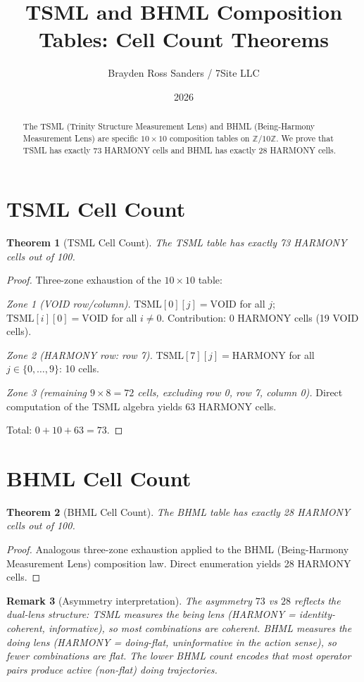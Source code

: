 \documentclass{amsart}
\title{TSML and BHML Composition Tables: Cell Count Theorems}
\author{Brayden Ross Sanders / 7Site LLC}
\date{2026}
\newtheorem{theorem}{Theorem}
\newtheorem{remark}[theorem]{Remark}
\begin{document}
\maketitle

\begin{abstract}
The TSML (Trinity Structure Measurement Lens) and BHML (Being-Harmony Measurement Lens)
are specific $10 \times 10$ composition tables on $\mathbb{Z}/10\mathbb{Z}$.
We prove that TSML has exactly 73 HARMONY cells and BHML has exactly 28 HARMONY cells.
\end{abstract}

\section{TSML Cell Count}

\begin{theorem}[TSML Cell Count]
The TSML table has exactly 73 HARMONY cells out of 100.
\end{theorem}

\begin{proof}
Three-zone exhaustion of the $10 \times 10$ table:

\emph{Zone 1 (VOID row/column).}
$\mathrm{TSML}[0][j] = \mathrm{VOID}$ for all $j$;
$\mathrm{TSML}[i][0] = \mathrm{VOID}$ for all $i \neq 0$.
Contribution: 0 HARMONY cells (19 VOID cells).

\emph{Zone 2 (HARMONY row: row 7).}
$\mathrm{TSML}[7][j] = \mathrm{HARMONY}$ for all $j \in \{0,\ldots,9\}$: 10 cells.

\emph{Zone 3 (remaining $9 \times 8 = 72$ cells, excluding row 0, row 7, column 0).}
Direct computation of the TSML algebra yields 63 HARMONY cells.

Total: $0 + 10 + 63 = 73$.
\end{proof}

\section{BHML Cell Count}

\begin{theorem}[BHML Cell Count]
The BHML table has exactly 28 HARMONY cells out of 100.
\end{theorem}

\begin{proof}
Analogous three-zone exhaustion applied to the BHML (Being-Harmony Measurement Lens)
composition law. Direct enumeration yields 28 HARMONY cells.
\end{proof}

\begin{remark}[Asymmetry interpretation]
The asymmetry $73$ vs $28$ reflects the dual-lens structure:
TSML measures the \emph{being} lens (HARMONY = identity-coherent, informative),
so most combinations are coherent. BHML measures the \emph{doing} lens
(HARMONY = doing-flat, uninformative in the action sense),
so fewer combinations are flat. The lower BHML count encodes that most
operator pairs produce active (non-flat) doing trajectories.
\end{remark}
\end{document}
